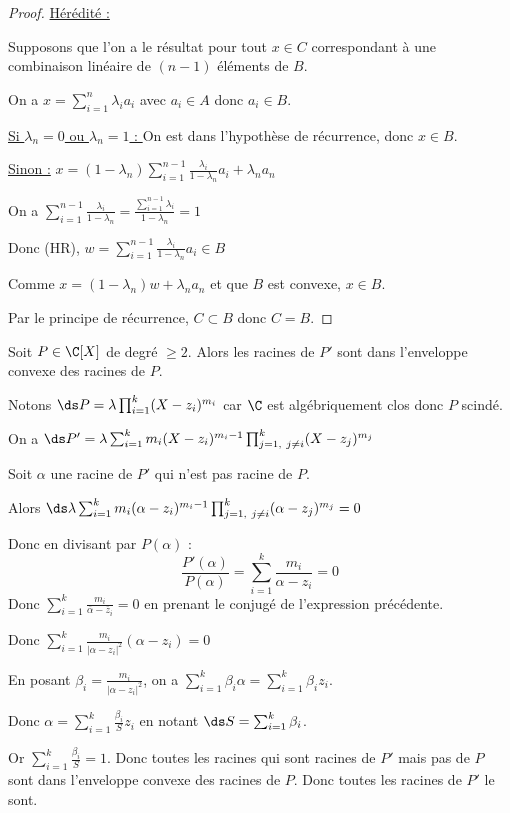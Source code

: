 \begin{proof}
    \uline{Hérédité :}

    Supposons que l'on a le résultat pour tout $x \in C$ correspondant à une combinaison
    linéaire de $(n - 1)$ éléments de $B$. 

    On a $\displaystyle x = \sum_{i = 1}^n \lambda_i a_i$ avec $a_i \in A$ donc $a_i \in B$.

    \quad \underline{Si $\lambda_n = 0$ ou $\lambda_n = 1$ : } On est dans l'hypothèse 
    de récurrence, donc $x \in B$. 

    \quad \underline{Sinon :} $\displaystyle x = (1 - \lambda_n) \sum_{i = 1}^{n - 1} \frac{\lambda_i}{1 - \lambda_n} a_i + \lambda_n a_n$

    On a $\displaystyle \sum_{i = 1}^{n - 1} \frac{\lambda_i}{1 - \lambda_n} = \frac{\sum_{i = 1}^{n - 1} \lambda_i}{1 - \lambda_n} = 1$

    Donc (HR), $\displaystyle w = \sum_{i = 1}^{n-1} \frac{\lambda_i}{1 - \lambda_n} a_i \in B$

    Comme $\displaystyle x = (1 - \lambda_n)w + \lambda_n a_n$ et que $B$ est convexe, $x \in B$. 

    Par le principe de récurrence, $C \subset B$ donc $C = B$. 
\end{proof}

\begin{exemple}
    Soit $P \in \C[X]$ de degré $\geqslant 2$. Alors les racines de $P'$ sont dans 
    l'enveloppe convexe des racines de $P$. 

    Notons $\ds P = \lambda \prod_{i = 1}^{k}(X - z_i)^{m_i}$ car $\C$ est algébriquement clos
    donc $P$ scindé. 

    On a $\ds P' = \lambda \sum_{i = 1}^{k} m_i (X - z_i)^{m_i - 1} \prod_{j = 1,~j\not= i}^{k}(X - z_j)^{m_j}$

    Soit $\alpha$ une racine de $P'$ qui n'est pas racine de $P$.

    Alors $\ds \lambda\sum_{i = 1}^{k }m_i(\alpha - z_i)^{m_i - 1} \prod_{j = 1,~j\not= i}^{k } (\alpha - z_j)^{m_j} = 0$

    Donc en divisant par $P(\alpha)$ : 
    \[\frac{P'(\alpha)}{P(\alpha)}= \sum_{i = 1}^{k } \frac{m_i}{\alpha - z_i} = 0\]
    Donc $\displaystyle \sum_{i = 1}^{k} \frac{m_i}{\overline \alpha - \overline z_i} = 0$ en prenant le conjugé de l'expression précédente.
    
    Donc $\displaystyle \sum_{i = 1}^{k}\frac{m_i }{|\alpha - z_i|^2} (\alpha - z_i) = 0$
    
    En posant $\beta_i = \frac{m_i}{|\alpha - z_i|^2}$, on a
    $\displaystyle \sum_{i = 1}^{k}\beta_i \alpha = \sum_{i = 1}^{k} \beta_i z_i$.

    Donc $\displaystyle \alpha = \sum_{i = 1}^{k}\frac{\beta_i}{S} z_i$ en notant $\ds S = \sum_{i=1}^k \beta_i$.

    Or $\displaystyle \sum_{i = 1}^{k}\frac{\beta_i }{S} = 1$.
    Donc toutes les racines qui sont racines de $P'$ mais pas de $P$ sont dans l'enveloppe convexe des racines de $P$.
    Donc toutes les racines de $P'$ le sont.
\end{exemple}

